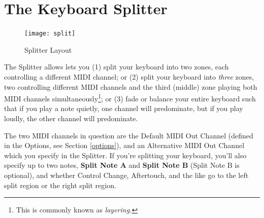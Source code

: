 \documentclass{article}
\begin{document}
\clearpage

\section {The Keyboard Splitter}
\label{splitter}

\begin{figure}
\vspace{-1.5em}\texttt{[image: split]}
\vspace{-2em}\caption{\small Splitter Layout}
\label{splitter}
\end{figure}

The Splitter allows lets you (1) split your keyboard into two zones, each controlling a different MIDI channel; or (2) split your keyboard into {\it three} zones, two controlling different MIDI channels and the third (middle) zone playing both MIDI channels simultaneously\footnote{This is commonly known as {\it layering.}}; or (3) fade or balance your entire keyboard such that if you play a note quietly, one channel will predominate, but if you play loudly, the other channel will predominate.

The two MIDI channels in question are the Default MIDI Out Channel (defined in the Options, see Section \ref{options}), and an Alternative MIDI Out Channel which you specify in the Splitter.  If you're splitting your keyboard, you'll also specify up to two notes, {\bf Split Note A} and {\bf Split Note B}  (Split Note B is optional), and whether Control Change, Aftertouch, and the like go to the left split region or the right split region.
\end{document}
